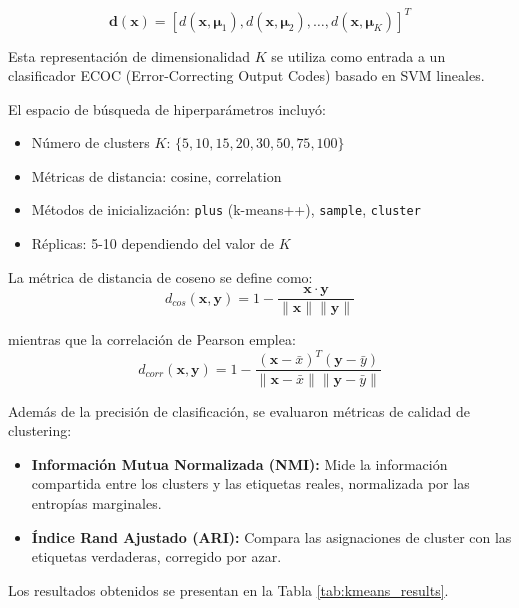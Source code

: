\documentclass[11pt, a4paper]{article}
\begin{document}
\begin{equation}
\mathbf{d}(\mathbf{x}) = [d(\mathbf{x}, \boldsymbol{\mu}_1), d(\mathbf{x}, \boldsymbol{\mu}_2), \ldots, d(\mathbf{x}, \boldsymbol{\mu}_K)]^T
\end{equation}

Esta representación de dimensionalidad $K$ se utiliza como entrada a un clasificador ECOC (Error-Correcting Output Codes) basado en SVM lineales.

El espacio de búsqueda de hiperparámetros incluyó:
\begin{itemize}
    \item Número de clusters $K$: $\{5, 10, 15, 20, 30, 50, 75, 100\}$
    \item Métricas de distancia: cosine, correlation
    \item Métodos de inicialización: \texttt{plus} (k-means++), \texttt{sample}, \texttt{cluster}
    \item Réplicas: 5-10 dependiendo del valor de $K$
\end{itemize}

La métrica de distancia de coseno se define como:
\begin{equation}
d_{cos}(\mathbf{x}, \mathbf{y}) = 1 - \frac{\mathbf{x} \cdot \mathbf{y}}{\|\mathbf{x}\| \|\mathbf{y}\|}
\end{equation}

 mientras que la correlación de Pearson emplea:
\begin{equation}
d_{corr}(\mathbf{x}, \mathbf{y}) = 1 - \frac{(\mathbf{x} - \bar{x})^T (\mathbf{y} - \bar{y})}{\|\mathbf{x} - \bar{x}\| \|\mathbf{y} - \bar{y}\|}
\end{equation}

Además de la precisión de clasificación, se evaluaron métricas de calidad de clustering:
\begin{itemize}
    \item \textbf{Información Mutua Normalizada (NMI):} Mide la información compartida entre los clusters y las etiquetas reales, normalizada por las entropías marginales.
    \item \textbf{Índice Rand Ajustado (ARI):} Compara las asignaciones de cluster con las etiquetas verdaderas, corregido por azar.
\end{itemize}

Los resultados obtenidos se presentan en la Tabla \ref{tab:kmeans_results}.
\end{document}
